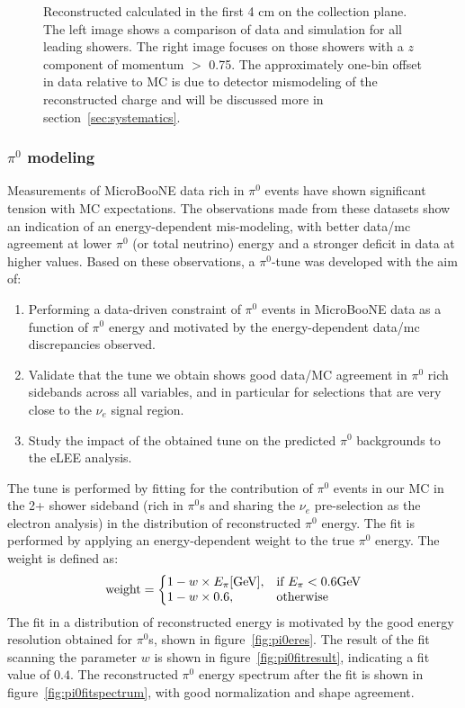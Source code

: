 \begin{figure}[H]
\begin{center}
\caption{Reconstructed \dedx calculated in the first 4 cm on the collection plane. The left image shows a comparison of data and simulation for all leading showers. The right image focuses on those showers with a $z$ component of momentum $>$ 0.75. The approximately one-bin offset in data relative to MC is due to detector mismodeling of the reconstructed charge and will be discussed more in section~\ref{sec:systematics}.}
\label{fig:pi0:dedxbest}
\end{center}
\end{figure}

\subsubsection{$\pi^0$ modeling}
\label{sec:pi0tune}
\par Measurements of MicroBooNE data rich in $\pi^0$ events have shown significant tension with MC expectations. The observations made from these datasets show an indication of an energy-dependent mis-modeling, with better data/mc agreement at lower $\pi^0$ (or total neutrino) energy and a stronger deficit in data at higher values. Based on these observations, a $\pi^0$-tune was developed with the aim of:
\begin{enumerate}
    \item Performing a data-driven constraint of $\pi^0$ events in MicroBooNE data as a function of $\pi^0$ energy and motivated by the energy-dependent data/mc discrepancies observed.
    \item Validate that the tune we obtain shows good data/MC agreement in $\pi^0$ rich sidebands across all variables, and in particular for selections that are very close to the $\nu_e$ signal region.
    \item Study the impact of the obtained tune on the predicted $\pi^0$ backgrounds to the eLEE analysis.
\end{enumerate}
The tune is performed by fitting for the contribution of $\pi^0$ events in our MC in the 2+ shower sideband (rich in $\pi^0$s and sharing the $\nu_e$ pre-selection as the electron analysis) in the distribution of reconstructed $\pi^0$ energy. The fit is performed by applying an energy-dependent weight to the true $\pi^0$ energy. The weight is defined as:
\begin{equation}
  \text{weight}=\left\{
  \begin{array}{@{}ll@{}}
    1 - w \times E_{\pi} [\text{GeV}], & \text{if}\ E_{\pi} < 0.6 \text{GeV} \\
    1 - w \times 0.6, & \text{otherwise}
  \end{array}\right.
\end{equation} 
The fit in a distribution of reconstructed energy is motivated by the good energy resolution obtained for $\pi^0$s, shown in figure~\ref{fig:pi0eres}. The result of the fit scanning the parameter $w$ is shown in figure~\ref{fig:pi0fitresult}, indicating a fit value of $0.4$. The reconstructed $\pi^0$ energy spectrum after the fit is shown in figure~\ref{fig:pi0fitspectrum}, with good normalization and shape agreement.


